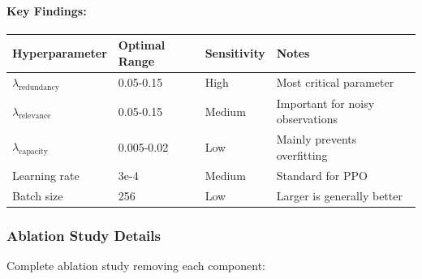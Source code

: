 \documentclass[10pt, letterpaper]{article}
\begin{document}
\paragraph{Key Findings:}

\begin{center}
\begin{tabular}{llll}
\toprule
\textbf{Hyperparameter} & \textbf{Optimal Range} & \textbf{Sensitivity} & \textbf{Notes} \\
\midrule
$\lambda_{\text{redundancy}}$ & 0.05-0.15 & High & Most critical parameter \\
$\lambda_{\text{relevance}}$ & 0.05-0.15 & Medium & Important for noisy observations \\
$\lambda_{\text{capacity}}$ & 0.005-0.02 & Low & Mainly prevents overfitting \\
Learning rate & 3e-4 & Medium & Standard for PPO \\
Batch size & 256 & Low & Larger is generally better \\
\bottomrule
\end{tabular}
\end{center}

\subsubsection{Ablation Study Details}

Complete ablation study removing each component:
\end{document}
